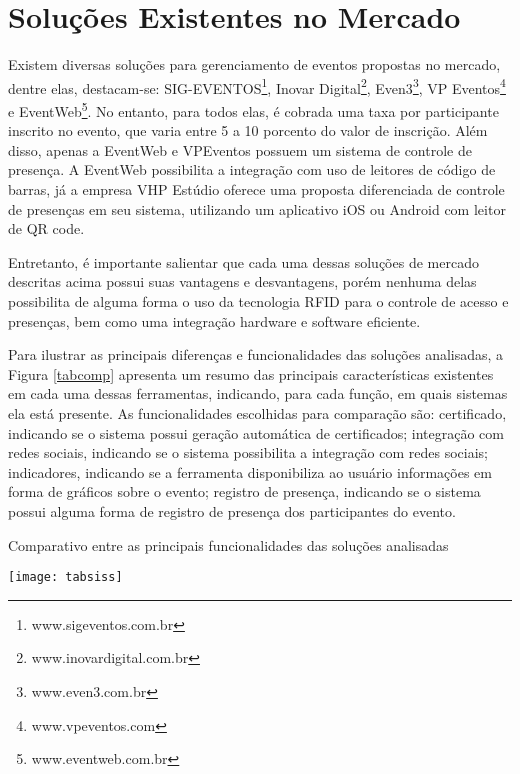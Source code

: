 \documentclass[tcc,capa]{texufpel}
\begin{document}
    
    \section{Soluções Existentes no Mercado}
    
        Existem diversas soluções para gerenciamento de eventos propostas no mercado, dentre elas, destacam-se: SIG-EVENTOS\footnote[1]{www.sigeventos.com.br}, Inovar Digital\footnote[2]{www.inovardigital.com.br}, Even3\footnote[3]{www.even3.com.br}, VP Eventos\footnote[4]{www.vpeventos.com} e EventWeb\footnote[5]{www.eventweb.com.br}. No entanto, para todos elas, é cobrada uma taxa por participante inscrito no evento, que varia entre 5 a 10 porcento do valor de inscrição. Além disso, apenas a EventWeb e VPEventos possuem um sistema de controle de presença. 
        A EventWeb possibilita a integração com uso de leitores de código de barras,
        já a empresa VHP Estúdio oferece uma proposta diferenciada de controle de presenças em seu sistema, utilizando um aplicativo iOS ou Android com leitor de QR code. 
        
        Entretanto, é importante salientar que cada uma dessas soluções de mercado descritas acima possui suas vantagens e desvantagens, porém nenhuma delas possibilita de alguma forma o uso da tecnologia RFID para o controle de acesso e presenças, bem como uma integração hardware e software eficiente.
        
        Para ilustrar as principais diferenças e funcionalidades das soluções analisadas, a Figura \ref{tabcomp}  apresenta um resumo das principais características existentes em cada uma dessas ferramentas, indicando, para cada função, em quais sistemas ela está presente. As funcionalidades escolhidas para comparação são: certificado, indicando se o sistema possui geração automática de certificados; integração com redes sociais, indicando se o sistema possibilita a integração com redes sociais; indicadores, indicando se a ferramenta disponibiliza ao usuário informações em forma de gráficos sobre o evento; registro de presença, indicando se o sistema possui alguma forma de registro de presença dos participantes do evento. 
    
       \begin{table}[htbp]
       \caption{ Comparativo entre as principais funcionalidades das soluções analisadas} 
            \centering \texttt{[image: tabsiss]}
            
            \label{tabcomp}
        \end{table}
    
\end{document}
